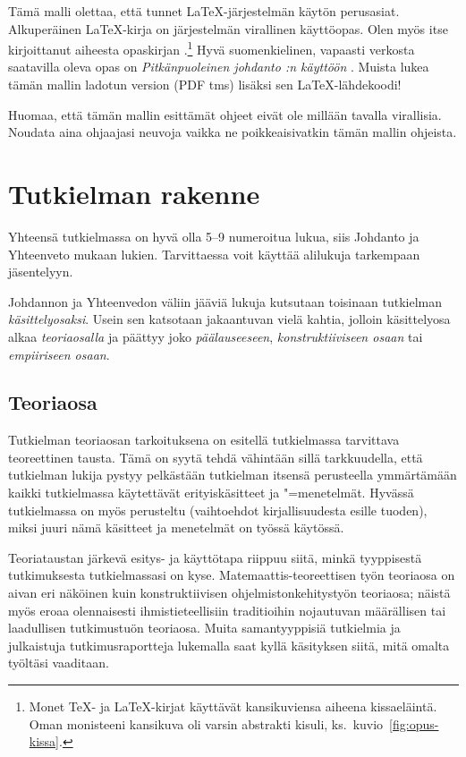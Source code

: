 \documentclass[utf8,bachelor]{gradu3}
\begin{document}
Tämä malli olettaa, että tunnet \LaTeX-järjestelmän käytön perusasiat.
Alkuperäinen \LaTeX-kirja \parencite{lamport94:_latex} on järjestelmän
virallinen käyttöopas.  Olen myös itse kirjoittanut aiheesta
opaskirjan \parencite{kaijanaho03:_latex_ams_latex}.\footnote{Monet
  \TeX- ja \LaTeX-kirjat käyttävät kansikuviensa aiheena kissaeläintä.
  Oman monisteeni kansikuva oli varsin abstrakti kisuli,
  ks.~kuvio~\ref{fig:opus-kissa}.}  Hyvä suomenkielinen, vapaasti
verkosta saatavilla oleva opas on \textit{Pitkänpuoleinen johdanto
  \LaTeXe:n käyttöön} \parencite{oetiker:_pitka_latex}.  Muista lukea
tämän mallin ladotun version (PDF tms) lisäksi sen \LaTeX-lähdekoodi!

Huomaa, että tämän mallin esittämät ohjeet eivät ole millään tavalla
virallisia.  Noudata aina ohjaajasi neuvoja vaikka ne poikkeaisivatkin
tämän mallin ohjeista.

\chapter{Tutkielman rakenne}

Yhteensä tutkielmassa on hyvä olla 5--9 numeroitua
lukua, siis Johdanto ja Yhteenveto mukaan lukien.  Tarvittaessa voit
käyttää alilukuja tarkempaan jäsentelyyn.

Johdannon ja Yhteenvedon väliin jääviä lukuja kutsutaan toisinaan
tutkielman \textit{käsittelyosaksi}.  Usein sen katsotaan jakaantuvan
vielä kahtia, jolloin käsittelyosa alkaa \textit{teoriaosalla} ja
päättyy joko \textit{päälauseeseen}, \textit{konstruktiiviseen osaan}
tai \textit{empiiriseen osaan}.

\section{Teoriaosa}

Tutkielman teoriaosan tarkoituksena on esitellä tutkielmassa
tarvittava teoreettinen tausta.  Tämä on syytä tehdä vähintään sillä
tarkkuudella, että tutkielman lukija pystyy pelkästään tutkielman
itsensä perusteella ymmärtämään kaikki tutkielmassa käytettävät
erityiskäsitteet ja "=menetelmät.  Hyvässä tutkielmassa on myös
perusteltu (vaihtoehdot kirjallisuudesta esille tuoden), miksi juuri
nämä käsitteet ja menetelmät on työssä käytössä.

Teoriataustan järkevä esitys- ja käyttötapa riippuu siitä, minkä
tyyppisestä tutkimuksesta tutkielmassasi on kyse.
Matemaattis-teoreettisen työn teoriaosa on aivan eri näköinen kuin
konstruktiivisen ohjelmistonkehitystyön teoriaosa; näistä myös eroaa
olennaisesti ihmistieteellisiin traditioihin nojautuvan määrällisen
tai laadullisen tutkimustuön teoriaosa.  Muita samantyyppisiä
tutkielmia ja julkaistuja tutkimusraportteja lukemalla saat kyllä
käsityksen siitä, mitä omalta työltäsi vaaditaan.
\end{document}
